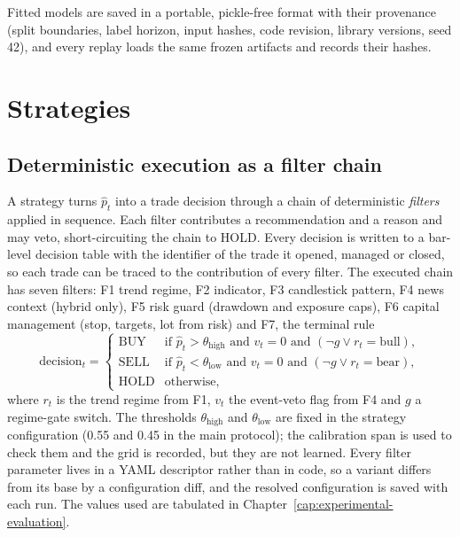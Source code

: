 Fitted models are saved in a portable, pickle-free format with their provenance (split boundaries, label horizon, input hashes, code revision, library versions, seed 42), and every replay loads the same frozen artifacts and records their hashes.

\section{Strategies} \label{sec:strategies}

\subsection{Deterministic execution as a filter chain} \label{subsec:deterministic-execution}

A strategy turns $\hat{p}_t$ into a trade decision through a chain of deterministic \emph{filters} applied in sequence. Each filter contributes a recommendation and a reason and may veto, short-circuiting the chain to HOLD. Every decision is written to a bar-level decision table with the identifier of the trade it opened, managed or closed, so each trade can be traced to the contribution of every filter. The executed chain has seven filters: F1 trend regime, F2 indicator, F3 candlestick pattern, F4 news context (hybrid only), F5 risk guard (drawdown and exposure caps), F6 capital management (stop, targets, lot from risk) and F7, the terminal rule
\begin{equation*}
\mathrm{decision}_t = \begin{cases}
\text{BUY}  & \text{if } \hat{p}_t > \theta_{\text{high}} \text{ and } v_t = 0 \text{ and } (\neg g \lor r_t = \text{bull}), \\
\text{SELL} & \text{if } \hat{p}_t < \theta_{\text{low}} \text{ and } v_t = 0 \text{ and } (\neg g \lor r_t = \text{bear}), \\
\text{HOLD} & \text{otherwise},
\end{cases}
\end{equation*}
where $r_t$ is the trend regime from F1, $v_t$ the event-veto flag from F4 and $g$ a regime-gate switch. The thresholds $\theta_{\text{high}}$ and $\theta_{\text{low}}$ are fixed in the strategy configuration (0.55 and 0.45 in the main protocol); the calibration span is used to check them and the grid is recorded, but they are not learned. Every filter parameter lives in a YAML descriptor rather than in code, so a variant differs from its base by a configuration diff, and the resolved configuration is saved with each run. The values used are tabulated in Chapter~\ref{cap:experimental-evaluation}.

